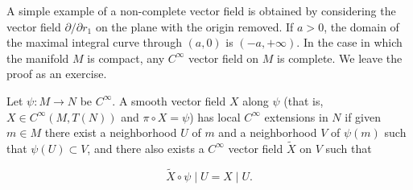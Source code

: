 \begin{remarks}\label{thm:1.50}
	A simple example of a non-complete vector field is obtained by considering the vector field $\partial/\partial r_{1}$ on the plane with the origin removed. If $a>0$, the domain of the maximal integral curve through $(a,0)$ is $(-a,+\infty)$. In the case in which the manifold $M$ is compact, any $C^{\infty}$ vector field on $M$ is complete. We leave the proof as an exercise.

\end{remarks}

\begin{definition}\label{thm:1.51}
	Let $\psi: M \to N$ be $C^\infty$. A smooth vector field $X$ along $\psi$ (that is, $X \in C^\infty(M, T(N))$ and $\pi \circ X = \psi$) has local $C^\infty$ extensions in $N$ if given $m \in M$ there exist a neighborhood $U$ of $m$ and a neighborhood $V$ of $\psi(m)$ such that $\psi(U) \subset V$, and there also exists a $C^\infty$ vector field $\tilde{X}$ on $V$ such that

	\begin{equation}
		\tag{1}\label{eq:1.51:1}
		\tilde{X}\circ\psi\mid U=X\mid U.
	\end{equation}

\end{definition}

